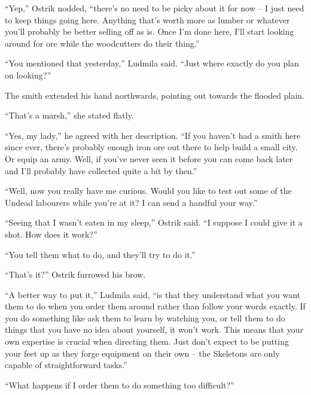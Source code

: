 

“Yep,” Ostrik nodded, “there’s no need to be picky about it for now – I just need to keep things going here. Anything that’s worth more as lumber or whatever you’ll probably be better selling off as is. Once I’m done here, I’ll start looking around for ore while the woodcutters do their thing.”

 

“You mentioned that yesterday,” Ludmila said. “Just where exactly do you plan on looking?”

 

The smith extended his hand northwards, pointing out towards the flooded plain.

 

“That’s a marsh,” she stated flatly.

 

“Yes, my lady,” he agreed with her description. “If you haven’t had a smith here since ever, there’s probably enough iron ore out there to help build a small city. Or equip an army. Well, if you’ve never seen it before you can come back later and I’ll probably have collected quite a bit by then.”

 

“Well, now you really have me curious. Would you like to test out some of the Undead labourers while you’re at it? I can send a handful your way.”

 

“Seeing that I wasn’t eaten in my sleep,” Ostrik said. “I suppose I could give it a shot. How does it work?”

 

“You tell them what to do, and they’ll try to do it.”

 

“That’s it?” Ostrik furrowed his brow.

 

“A better way to put it,” Ludmila said, “is that they understand what you want them to do when you order them around rather than follow your words exactly. If you do something like ask them to learn by watching you, or tell them to do things that you have no idea about yourself, it won’t work. This means that your own expertise is crucial when directing them. Just don’t expect to be putting your feet up as they forge equipment on their own – the Skeletons are only capable of straightforward tasks.”

 

“What happens if I order them to do something too difficult?”

